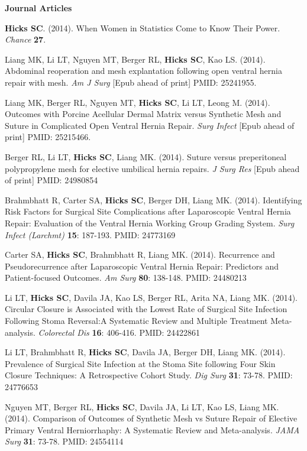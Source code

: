 \documentclass[10pt]{article}
\renewcommand{\section}[2]%
        {\pagebreak[2]\vspace{1.3\baselineskip}%
         \phantomsection\addcontentsline{toc}{section}{#1}%
         \hspace{0in}%
         \marginpar{
         \raggedright \scshape #1}#2}
\begin{document}
\section{Research}  
\textbf{Journal Articles}
\begin{enumerate}[label= {[\arabic*]}]
\item {\bf Hicks SC}. (2014). When Women in Statistics Come to Know Their Power. {\it Chance} {\bf 27}. 
\item Liang MK, Li LT, Nguyen MT, Berger RL, {\bf Hicks SC}, Kao LS. (2014). Abdominal reoperation and mesh explantation following open ventral hernia repair with mesh. {\it Am J Surg} [Epub ahead of print] PMID: 25241955. 
\item Liang MK, Berger RL, Nguyen MT, {\bf Hicks SC}, Li LT, Leong M. (2014). Outcomes with Porcine Acellular Dermal Matrix versus Synthetic Mesh and Suture in Complicated Open Ventral Hernia Repair. {\it Surg Infect} [Epub ahead of print] PMID: 25215466. 
\item Berger RL, Li LT, {\bf Hicks SC}, Liang MK. (2014). Suture versus preperitoneal polypropylene mesh for elective umbilical hernia repairs. {\it J Surg Res} [Epub ahead of print] PMID: 24980854 
\item Brahmbhatt R, Carter SA, {\bf Hicks SC}, Berger DH, Liang MK. (2014). Identifying Risk Factors for Surgical Site Complications after Laparoscopic Ventral Hernia Repair: Evaluation of the Ventral Hernia Working Group Grading System. {\it Surg Infect (Larchmt)} {\bf 15}: 187-193. PMID: 24773169
\item Carter SA, {\bf Hicks SC}, Brahmbhatt R, Liang MK. (2014). Recurrence and Pseudorecurrence after Laparoscopic Ventral Hernia Repair: Predictors and Patient-focused Outcomes. {\it Am Surg} {\bf 80}: 138-148. PMID: 24480213
\item Li LT, {\bf Hicks SC}, Davila JA, Kao LS, Berger RL, Arita NA, Liang MK. (2014). Circular Closure is Associated with the Lowest Rate of Surgical Site Infection Following Stoma Reversal:A Systematic Review and Multiple Treatment Meta-analysis. {\it Colorectal Dis} {\bf 16}: 406-416. PMID: 24422861
\item Li LT, Brahmbhatt R, {\bf Hicks SC}, Davila JA, Berger DH, Liang MK. (2014). Prevalence of Surgical Site Infection at the Stoma Site following Four Skin Closure Techniques: A Retrospective Cohort Study. {\it Dig Surg} {\bf 31}: 73-78. PMID: 24776653
\item Nguyen MT, Berger RL, {\bf Hicks SC}, Davila JA, Li LT, Kao LS, Liang MK. (2014). Comparison of Outcomes of Synthetic Mesh vs Suture Repair of Elective Primary Ventral Herniorrhaphy: A Systematic Review and Meta-analysis. {\it JAMA Surg} {\bf 31}: 73-78. PMID: 24554114 

\end{enumerate}
\end{document}

